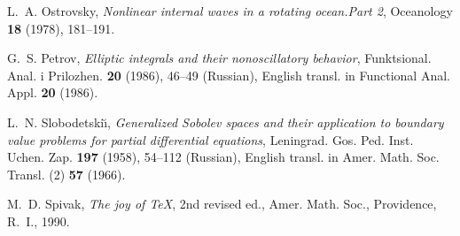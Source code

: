 \documentclass[12pt]{article}
\begin{document}
\begin{thebibliography}{10}
L.~A. Ostrovsky,
 {\em Nonlinear internal waves in a rotating ocean.{\rm Part 2}}, 
  Oceanology {\bf 18} (1978), 181--191.

G.~S. Petrov,
 {\em Elliptic integrals and their nonoscillatory behavior},
  Funktsional. Anal. i Pri\-lo\-zhen. {\bf 20} (1986), 46--49 (Russian),
  English transl. in Functional Anal. Appl. {\bf 20} (1986).

L.~N. Slobodetski\u\i,
 {\em Generalized {S}obolev spaces and their application
  to boundary value problems for partial differential equations},
 Leningrad.  Gos. Ped. Inst. Uchen. Zap. {\bf 197} (1958), 54--112 (Russian), 
English  transl. in Amer. Math. Soc. Transl. (2) {\bf 57} (1966).

M.~D. Spivak,
 {\em The joy of {\TeX}}, 2nd revised ed.,
 Amer. Math. Soc.,  Providence, R.~I., 1990.

\end{thebibliography}
\end{document}
